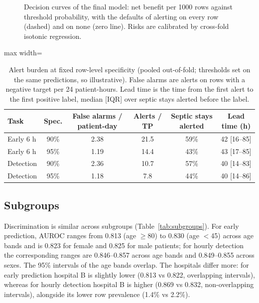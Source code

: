 \documentclass[preprint,12pt]{elsarticle}
\begin{document}
\begin{figure}[!t]
\caption{Decision curves of the final model: net benefit per 1000 rows against threshold probability, with the defaults of alerting on every row (dashed) and on none (zero line). Risks are calibrated by cross-fold isotonic regression.}
\label{fig:dca}
\end{figure}

\begin{table}[!t]
\centering\scriptsize
\caption{Alert burden at fixed row-level specificity (pooled out-of-fold; thresholds set on the same predictions, so illustrative). False alarms are alerts on rows with a negative target per 24 patient-hours. Lead time is the time from the first alert to the first positive label, median [IQR] over septic stays alerted before the label.}
\label{tab:burden}
\begin{adjustbox}{max width=\linewidth}
\begin{tabular}{lccccc}
\toprule
Task & Spec. & False alarms / patient-day & Alerts / TP & Septic stays alerted & Lead time (h) \\
\midrule
Early 6 h & 90\% & 2.38 & 21.5 & 59\% & 42 [16--85] \\
Early 6 h & 95\% & 1.19 & 14.4 & 43\% & 43 [17--85] \\
Detection & 90\% & 2.36 & 10.7 & 57\% & 40 [14--83] \\
Detection & 95\% & 1.18 & 7.8 & 44\% & 40 [14--86] \\
\bottomrule
\end{tabular}
\end{adjustbox}
\end{table}

\subsection{Subgroups}
Discrimination is similar across subgroups (Table~\ref{tab:subgroups}). For early prediction, AUROC ranges from 0.813 (age $\geq$80) to 0.830 (age $<$45) across age bands and is 0.823 for female and 0.825 for male patients; for hourly detection the corresponding ranges are 0.846--0.857 across age bands and 0.849--0.855 across sexes. The 95\% intervals of the age bands overlap. The hospitals differ more: for early prediction hospital B is slightly lower (0.813 vs 0.822, overlapping intervals), whereas for hourly detection hospital B is higher (0.869 vs 0.832, non-overlapping intervals), alongside its lower row prevalence (1.4\% vs 2.2\%).
\end{document}

